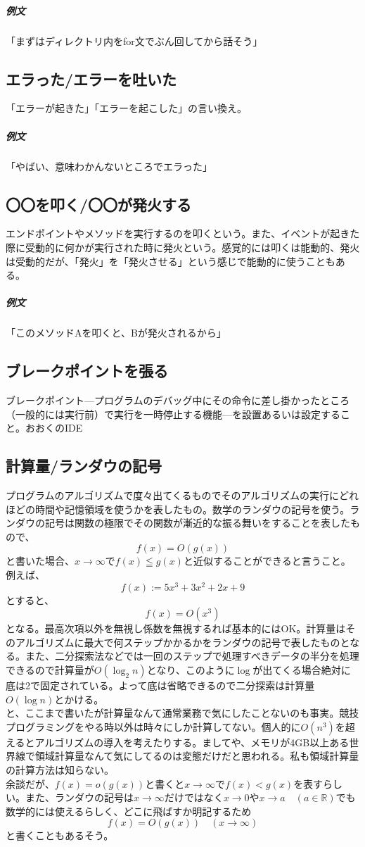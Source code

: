 \documentclass[a4paper]{ltjsreport}
\begin{document}
\subparagraph{例文}「まずはディレクトリ内をfor文でぶん回してから話そう」

\subsection{エラった/エラーを吐いた}
「エラーが起きた」「エラーを起こした」の言い換え。

\subparagraph{例文}「やばい、意味わかんないところでエラった」

\subsection{〇〇を叩く/〇〇が発火する}
エンドポイントやメソッドを実行するのを叩くという。また、イベントが起きた際に受動的に何かが実行された時に発火という。感覚的には叩くは能動的、発火は受動的だが、「発火」を「発火させる」という感じで能動的に使うこともある。

\subparagraph{例文}「このメソッドAを叩くと、Bが発火されるから」


\subsection{ブレークポイントを張る}
ブレークポイント---プログラムのデバッグ中にその命令に差し掛かったところ（一般的には実行前）で実行を一時停止する機能---を設置あるいは設定すること。おおくのIDE

\subsection{計算量/ランダウの記号}
プログラムのアルゴリズムで度々出てくるものでそのアルゴリズムの実行にどれほどの時間や記憶領域を使うかを表したもの。数学のランダウの記号を使う。ランダウの記号は関数の極限でその関数が漸近的な振る舞いをすることを表したもので、\[
  f(x) = O(g(x))
\]
と書いた場合、$x \to \infty$で$f(x) \leqq g(x)$と近似することができると言うこと。例えば、\[
  f(x) := 5x^3 + 3x^2 + 2x + 9
\]
とすると、\[
  f(x) = O(x^3)
\]
となる。最高次項以外を無視し係数を無視するれば基本的にはOK。計算量はそのアルゴリズムに最大で何ステップかかるかをランダウの記号で表したものとなる。また、二分探索法などでは一回のステップで処理すべきデータの半分を処理できるので計算量が$O(\log_2 n)$となり、このように$\log$が出てくる場合絶対に底は2で固定されている。よって底は省略できるので二分探索は計算量$O(\log n)$とかける。
\\

と、ここまで書いたが計算量なんて通常業務で気にしたことないのも事実。競技プログラミングをやる時以外は時々にしか計算してない。個人的に$O(n^3)$を超えるとアルゴリズムの導入を考えたりする。ましてや、メモリが4GB以上ある世界線で領域計算量なんて気にしてるのは変態だけだと思われる。私も領域計算量の計算方法は知らない。
\\

余談だが、$f(x) = o(g(x))$と書くと$x \to \infty$で$f(x) < g(x)$を表すらしい。また、ランダウの記号は$x \to \infty$だけではなく$x \to 0$や$x \to a \quad (a \in \mathbb{R})$でも数学的には使えるらしく、どこに飛ばすか明記するため\[f(x) = O(g(x)) \quad (x \to \infty)\]と書くこともあるそう。
\end{document}
